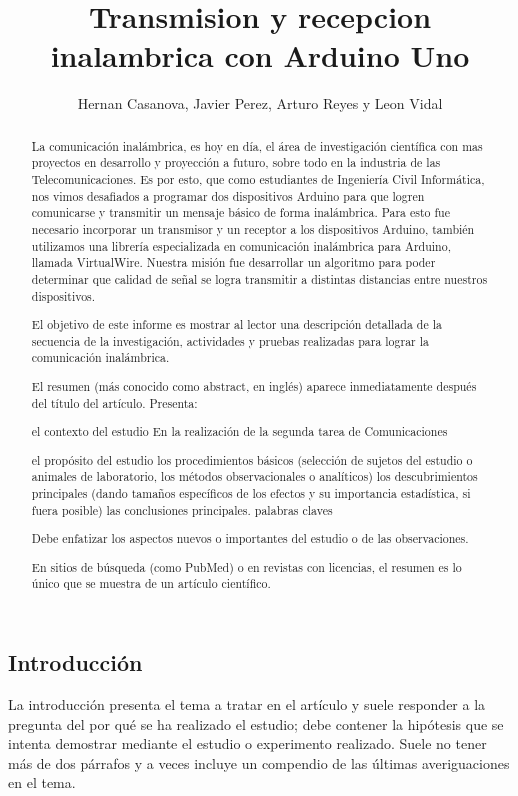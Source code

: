 \documentclass[10pt,letterpaper]{article}
\author{Hernan Casanova, Javier Perez, Arturo Reyes y Leon Vidal}
\title{Transmision y recepcion inalambrica con Arduino Uno}
\date{}
\begin{document}
\maketitle
\thispagestyle{empty}
\begin{multicols}{2}
\begin{abstract} 

La comunicación inalámbrica, es hoy en día, el área de investigación científica con mas proyectos en desarrollo y proyección a futuro, sobre todo en la industria de las Telecomunicaciones. Es por esto, que como estudiantes de Ingeniería Civil Informática, nos vimos desafiados a programar dos dispositivos Arduino para que logren comunicarse y transmitir un mensaje básico de forma inalámbrica. Para esto fue necesario incorporar un transmisor y un receptor a los dispositivos Arduino, también utilizamos una librería especializada en comunicación inalámbrica para Arduino, llamada VirtualWire. Nuestra misión fue desarrollar un algoritmo para poder determinar que calidad de señal se logra transmitir a distintas distancias entre nuestros dispositivos.

El objetivo de este informe es mostrar al lector una descripción detallada de la secuencia de la investigación, actividades y pruebas realizadas para lograr la comunicación inalámbrica.


El resumen (más conocido como abstract, en inglés) aparece inmediatamente después del título del artículo. Presenta:

    el contexto del estudio
En la realización de la segunda tarea de Comunicaciones    
    
    el propósito del estudio
    los procedimientos básicos (selección de sujetos del estudio o animales de laboratorio, los métodos observacionales o analíticos)
    los descubrimientos principales (dando tamaños específicos de los efectos y su importancia estadística, si fuera posible)
    las conclusiones principales.
    palabras claves

Debe enfatizar los aspectos nuevos o importantes del estudio o de las observaciones.

En sitios de búsqueda (como PubMed) o en revistas con licencias, el resumen es lo único que se muestra de un artículo científico.




\end{abstract}

\section{Introducción}
La introducción presenta el tema a tratar en el artículo y suele responder a la pregunta del por qué se ha realizado el estudio; debe contener la hipótesis que se intenta demostrar mediante el estudio o experimento realizado. Suele no tener más de dos párrafos y a veces incluye un compendio de las últimas averiguaciones en el tema.


\end{multicols}
\end{document}
